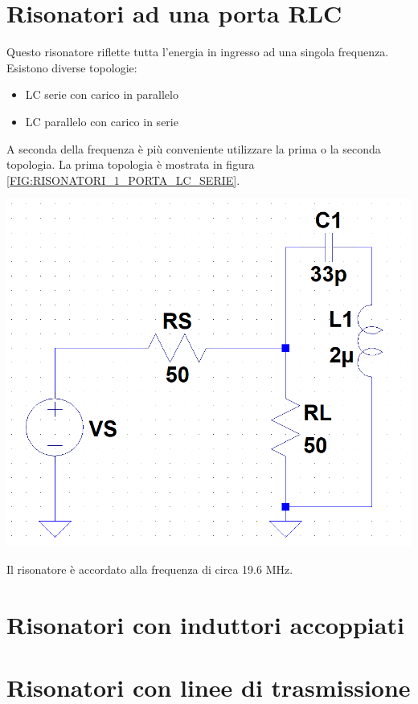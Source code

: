 \documentclass[10pt,a4paper]{book}
\begin{document}
\section{Risonatori ad una porta RLC}
Questo risonatore riflette tutta l'energia in ingresso ad una singola frequenza. Esistono diverse topologie: 
\begin{itemize}
\item LC serie con carico in parallelo
\item LC parallelo con carico in serie
\end{itemize}

A seconda della frequenza è più conveniente utilizzare la prima o la seconda topologia.
La prima topologia è mostrata in figura \ref{FIG:RISONATORI_1_PORTA_LC_SERIE}.
\begin{center}
\includegraphics[scale=0.5]{img/risonatori/risonatore_1_port_serie.png} 
\label{FIG:RISONATORI_1_PORTA_LC_SERIE}
\end{center}
Il risonatore è accordato alla frequenza di circa 19.6 MHz.


\section{Risonatori con induttori accoppiati}
\section{Risonatori con linee di trasmissione}
\end{document}
